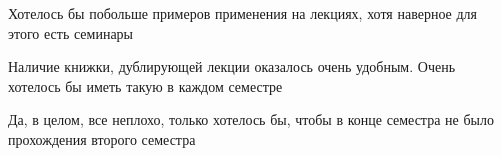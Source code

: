 		\begin{commentbox}
			Хотелось бы побольше примеров применения на лекциях, хотя наверное для этого есть семинары
		\end{commentbox}

		\begin{commentbox}
			Наличие книжки, дублирующей лекции оказалось очень удобным. Очень хотелось бы иметь такую в каждом семестре
		\end{commentbox}

		\begin{commentbox}
			Да, в целом, все неплохо, только хотелось бы, чтобы в конце семестра не было прохождения второго семестра
		\end{commentbox}